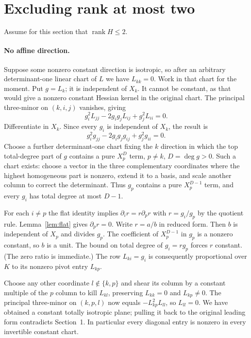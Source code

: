 \documentclass[11pt,a4paper]{article}
\newcommand{\rank}{\operatorname{rank}}
\begin{document}
\section{Excluding rank at most two}
Assume for this section that $\rank H\le2$.

\paragraph{No affine direction.}
Suppose some nonzero constant direction is isotropic, so after an arbitrary determinant-one linear chart of $L$ we have $L_{kk}=0$. Work in that chart for the moment. Put $g=L_k$; it is independent of $X_k$. It cannot be constant, as that would give a nonzero constant Hessian kernel in the original chart. The principal three-minor on $(k,i,j)$ vanishes, giving
\[
 g_i^2 L_{jj}-2g_ig_j L_{ij}+g_j^2 L_{ii}=0.
\]
Differentiate in $X_k$. Since every $g_i$ is independent of $X_k$, the result is
\[
 g_i^2 g_{jj}-2g_ig_jg_{ij}+g_j^2g_{ii}=0.
\]
Choose a further determinant-one chart fixing the $k$ direction in which the top total-degree part of $g$ contains a pure $X_p^D$ term, $p\ne k$, $D=\deg g>0$. Such a chart exists: choose a vector in the three complementary coordinates where the highest homogeneous part is nonzero, extend it to a basis, and scale another column to correct the determinant. Thus $g_p$ contains a pure $X_p^{D-1}$ term, and every $g_i$ has total degree at most $D-1$.

For each $i\ne p$ the flat identity implies $\partial_i r=r\partial_pr$ with $r=g_i/g_p$ by the quotient rule. Lemma~\ref{lem:flat} gives $\partial_pr=0$. Write $r=a/b$ in reduced form. Then $b$ is independent of $X_p$ and divides $g_p$. The coefficient of $X_p^{D-1}$ in $g_p$ is a nonzero constant, so $b$ is a unit. The bound on total degree of $g_i=rg_p$ forces $r$ constant. (The zero ratio is immediate.) The row $L_{ki}=g_i$ is consequently proportional over $K$ to its nonzero pivot entry $L_{kp}$.

Choose any other coordinate $l\notin\{k,p\}$ and shear its column by a constant multiple of the $p$ column to kill $L_{kl}$, preserving $L_{kk}=0$ and $L_{kp}\ne0$. The principal three-minor on $(k,p,l)$ now equals $-L_{kp}^2L_{ll}$, so $L_{ll}=0$. We have obtained a constant totally isotropic plane; pulling it back to the original leading form contradicts Section~1. In particular every diagonal entry is nonzero in every invertible constant chart.
\end{document}
